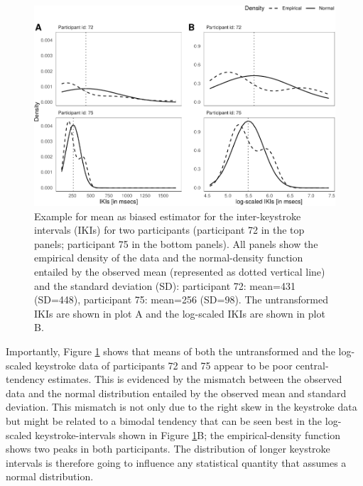 \documentclass[
  english,
  man,mask,floatsintext]{apa7}
\begin{document}
\begin{figure}[bp!]

{\centering \includegraphics{report_v2_files/figure-latex/example-1} 

}

\caption{Example for mean as biased estimator for the inter-keystroke intervals (IKIs) for two participants (participant 72 in the top panels; participant 75 in the bottom panels). All panels show the empirical density of the data and the normal-density function entailed by the observed mean (represented as dotted vertical line) and the standard deviation (SD): participant 72: mean=431 (SD=448), participant 75: mean=256 (SD=98). The untransformed IKIs are shown in plot A and the log-scaled IKIs are shown in plot B.}\label{fig:example}
\end{figure}

Importantly, Figure \ref{fig:example} shows that means of both the untransformed and the log-scaled keystroke data of participants 72 and 75 appear to be poor central-tendency estimates. This is evidenced by the mismatch between the observed data and the normal distribution entailed by the observed mean and standard deviation. This mismatch is not only due to the right skew in the keystroke data but might be related to a bimodal tendency that can be seen best in the log-scaled keystroke-intervals shown in Figure \ref{fig:example}B; the empirical-density function shows two peaks in both participants. The distribution of longer keystroke intervals is therefore going to influence any statistical quantity that assumes a normal distribution.
\end{document}
